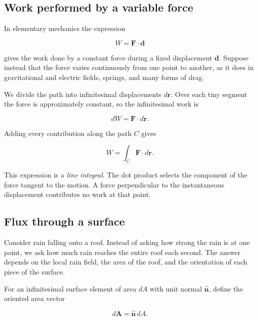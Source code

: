 \subsection{Work performed by a variable force}

In elementary mechanics the expression

\begin{equation}
  W=\mathbf F\cdot\mathbf d
\end{equation}

gives the work done by a constant force during a fixed displacement
$\mathbf d$. Suppose instead that the force varies continuously from one point
to another, as it does in gravitational and electric fields, springs, and many
forms of drag.

We divide the path into infinitesimal displacements $d\mathbf r$. Over each tiny
segment the force is approximately constant, so the infinitesimal work is

\begin{equation}
  dW=\mathbf F\cdot d\mathbf r.
\end{equation}

Adding every contribution along the path $C$ gives

\begin{equation}
  \boxed{W=\int_C \mathbf F\cdot d\mathbf r.}
\end{equation}

This expression is a \emph{line integral}. The dot product selects the component
of the force tangent to the motion. A force perpendicular to the instantaneous
displacement contributes no work at that point.

\subsection{Flux through a surface}

Consider rain falling onto a roof. Instead of asking how strong the rain is at
one point, we ask how much rain reaches the entire roof each second. The answer
depends on the local rain field, the area of the roof, and the orientation of
each piece of the surface.

For an infinitesimal surface element of area $dA$ with unit normal
$\hat{\mathbf n}$, define the oriented area vector

\begin{equation}
  d\mathbf A=\hat{\mathbf n}\,dA.
\end{equation}

